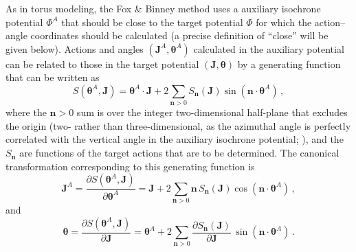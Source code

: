 \documentclass[12pt,preprint]{aastex}
\renewcommand{\vec}[1]{\ensuremath{\mathbf{#1}}}
\newcommand{\vecj}{\ensuremath{\vec{J}}}
\newcommand{\vecn}{\ensuremath{\vec{n}}}
\newcommand{\veca}{\ensuremath{\boldsymbol\theta}}
\begin{document}
As in torus modeling, the Fox \& Binney method uses a auxiliary
isochrone potential $\Phi^A$ that should be close to the target
potential $\Phi$ for which the action--angle coordinates should be
calculated (a precise definition of ``close'' will be given
below). Actions and angles $(\vecj^A,\veca^A)$ calculated in the
auxiliary potential can be related to those in the target potential
$(\vecj,\veca)$ by a generating function that can be written as
\citep{McGill90a}
\begin{equation}
  S(\veca^A,\vecj) = \veca^A\cdot\vecj+2\sum_{\vecn > 0} S_{\vecn}(\vecj)\sin(\vecn\cdot\veca^A)\,,
\end{equation}
where the $\vecn > 0$ sum is over the integer two-dimensional
half-plane that excludes the origin (two- rather than
three-dimensional, as the azimuthal angle is perfectly correlated with
the vertical angle in the auxiliary isochrone potential;
\citealt{binneytremaine}), and the $S_{\vecn}$ are functions of the
target actions that are to be determined. The canonical transformation
corresponding to this generating function is
\begin{equation}\label{eq:jjt}
  \vecj^A = \frac{\partial S(\veca^A,\vecj)}{\partial \veca^A} = \vecj + 2\sum_{\vecn > 0} \vecn\,S_{\vecn}(\vecj)\cos(\vecn\cdot\veca^A)\,,
\end{equation}
and
\begin{equation}\label{eq:aat}
  \veca = \frac{\partial S(\veca^A,\vecj)}{\partial \vecj} = \veca^A +2\sum_{\vecn > 0} \frac{\partial S_{\vecn}(\vecj)}{\partial \vecj}\,\sin(\vecn\cdot\veca^A)\,.
\end{equation}
\end{document}
